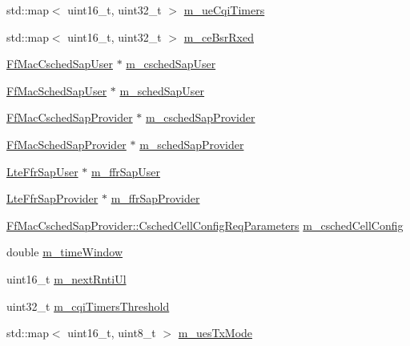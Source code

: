 \begin{DoxyCompactItemize}
std\+::map$<$ uint16\+\_\+t, uint32\+\_\+t $>$ \hyperlink{classns3_1_1PfFfMacScheduler_abe22b494875155dfe6a503734ad4bbad}{m\+\_\+ue\+Cqi\+Timers}
\item 
std\+::map$<$ uint16\+\_\+t, uint32\+\_\+t $>$ \hyperlink{classns3_1_1PfFfMacScheduler_a9d4cd2380a8e04f1e7d69ac67628b9cc}{m\+\_\+ce\+Bsr\+Rxed}
\item 
\hyperlink{classns3_1_1FfMacCschedSapUser}{Ff\+Mac\+Csched\+Sap\+User} $\ast$ \hyperlink{classns3_1_1PfFfMacScheduler_a8c2e26441f7ea338051bbdf73ce1303a}{m\+\_\+csched\+Sap\+User}
\item 
\hyperlink{classns3_1_1FfMacSchedSapUser}{Ff\+Mac\+Sched\+Sap\+User} $\ast$ \hyperlink{classns3_1_1PfFfMacScheduler_a16d9c49b69668f9343e9e7409179b8ae}{m\+\_\+sched\+Sap\+User}
\item 
\hyperlink{classns3_1_1FfMacCschedSapProvider}{Ff\+Mac\+Csched\+Sap\+Provider} $\ast$ \hyperlink{classns3_1_1PfFfMacScheduler_a18621fc8ff9d0fc2ff92977f9ac60b2b}{m\+\_\+csched\+Sap\+Provider}
\item 
\hyperlink{classns3_1_1FfMacSchedSapProvider}{Ff\+Mac\+Sched\+Sap\+Provider} $\ast$ \hyperlink{classns3_1_1PfFfMacScheduler_aa647c4209dac594ac05c56ec0335b692}{m\+\_\+sched\+Sap\+Provider}
\item 
\hyperlink{classns3_1_1LteFfrSapUser}{Lte\+Ffr\+Sap\+User} $\ast$ \hyperlink{classns3_1_1PfFfMacScheduler_a6a08e9753aa517cced82305cd4fbc0ec}{m\+\_\+ffr\+Sap\+User}
\item 
\hyperlink{classns3_1_1LteFfrSapProvider}{Lte\+Ffr\+Sap\+Provider} $\ast$ \hyperlink{classns3_1_1PfFfMacScheduler_a40519746bd3f39a4b664db3036f2e3fd}{m\+\_\+ffr\+Sap\+Provider}
\item 
\hyperlink{structns3_1_1FfMacCschedSapProvider_1_1CschedCellConfigReqParameters}{Ff\+Mac\+Csched\+Sap\+Provider\+::\+Csched\+Cell\+Config\+Req\+Parameters} \hyperlink{classns3_1_1PfFfMacScheduler_a0be1f7a1e78824b031e48208b8af1048}{m\+\_\+csched\+Cell\+Config}
\item 
double \hyperlink{classns3_1_1PfFfMacScheduler_aaa362a4608a53cc70f16fdfedf221bd4}{m\+\_\+time\+Window}
\item 
uint16\+\_\+t \hyperlink{classns3_1_1PfFfMacScheduler_ad4bed67ae396b364734c2cc0acc7e2ec}{m\+\_\+next\+Rnti\+Ul}
\item 
uint32\+\_\+t \hyperlink{classns3_1_1PfFfMacScheduler_ad2377e8bcc02252e2f0d3ca0fc2895b9}{m\+\_\+cqi\+Timers\+Threshold}
\item 
std\+::map$<$ uint16\+\_\+t, uint8\+\_\+t $>$ \hyperlink{classns3_1_1PfFfMacScheduler_afde3fb192a83a5fafc27ed9a0df82de9}{m\+\_\+ues\+Tx\+Mode}

\end{DoxyCompactItemize}
